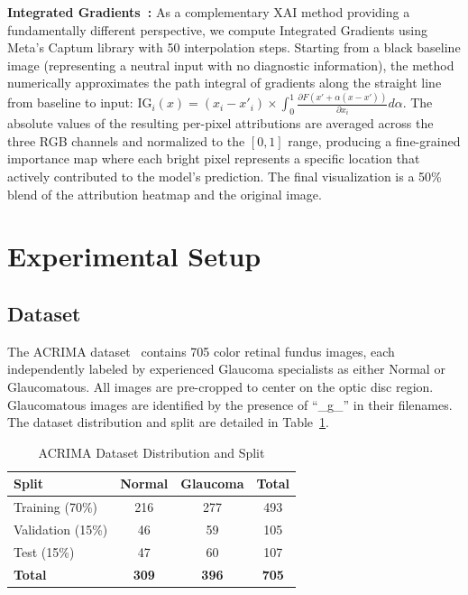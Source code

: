 \documentclass[conference]{IEEEtran}
\begin{document}
\textbf{Integrated Gradients~\cite{sundararajan2017}:} As a complementary XAI method providing a fundamentally different perspective, we compute Integrated Gradients using Meta's Captum library with 50 interpolation steps. Starting from a black baseline image (representing a neutral input with no diagnostic information), the method numerically approximates the path integral of gradients along the straight line from baseline to input: $\text{IG}_i(x) = (x_i - x'_i) \times \int_0^1 \frac{\partial F(x' + \alpha(x-x'))}{\partial x_i} d\alpha$. The absolute values of the resulting per-pixel attributions are averaged across the three RGB channels and normalized to the $[0, 1]$ range, producing a fine-grained importance map where each bright pixel represents a specific location that actively contributed to the model's prediction. The final visualization is a 50\% blend of the attribution heatmap and the original image.

\section{Experimental Setup}

\subsection{Dataset}
The ACRIMA dataset~\cite{diazpinto2019} contains 705 color retinal fundus images, each independently labeled by experienced Glaucoma specialists as either Normal or Glaucomatous. All images are pre-cropped to center on the optic disc region. Glaucomatous images are identified by the presence of ``\_g\_'' in their filenames. The dataset distribution and split are detailed in Table~\ref{tab:dataset}.

\begin{table}[h]
\centering
\caption{ACRIMA Dataset Distribution and Split}
\label{tab:dataset}
\begin{tabular}{lccc}
\toprule
\textbf{Split} & \textbf{Normal} & \textbf{Glaucoma} & \textbf{Total} \\
\midrule
Training (70\%)       & 216              & 277                & 493            \\
Validation (15\%)     & 46               & 59                 & 105            \\
Test (15\%)           & 47               & 60                 & 107            \\
\midrule
\textbf{Total}        & \textbf{309}     & \textbf{396}       & \textbf{705}   \\
\bottomrule
\end{tabular}
\end{table}
\end{document}
